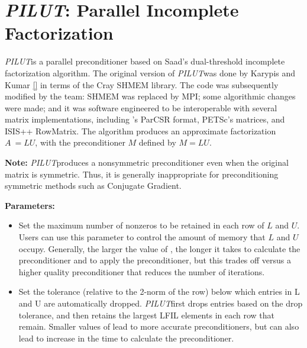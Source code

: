 \def\pilut{{\sl PILUT}}
\section{\pilut: Parallel Incomplete Factorization}
\label{PILUT}

\pilut is a parallel preconditioner based on Saad's dual-threshold incomplete
factorization algorithm. The original version of \pilut was done by Karypis and
Kumar \ref{} in terms of the Cray SHMEM library. The code was subsequently
modified by the \hypre team: SHMEM was replaced by MPI; some algorithmic
changes were made; and it was software engineered to be interoperable with
several matrix implementations, including \hypre 's ParCSR format, PETSc's
matrices, and ISIS++ RowMatrix. The algorithm produces an approximate
factorization $A ~= L U$, with the preconditioner $M$ defined by $ M = L U $.

{\bf Note:} \pilut produces a nonsymmetric preconditioner even when the
original matrix is symmetric. Thus, it is generally inappropriate for
preconditioning symmetric methods such as Conjugate Gradient.

{\bf Parameters:}

\begin{itemize}

\item
{}
Set the maximum number of nonzeros to be retained in each row of $L$ and $U$.
Users can use this parameter to control the amount of memory that $L$ and $U$
occupy. Generally, the larger the value of , the longer it takes to
calculate the preconditioner and to apply the preconditioner, but this trades
off versus a higher quality preconditioner that reduces the number of
iterations.

\item
{}
Set the tolerance (relative to the 2-norm of the row) below which entries in L
and U are automatically dropped. \pilut first drops entries based on the drop
tolerance, and then retains the largest LFIL elements in each row that remain.
Smaller values of  lead to more accurate preconditioners, but can
also lead to increase in the time to calculate the preconditioner.

\end{itemize}
